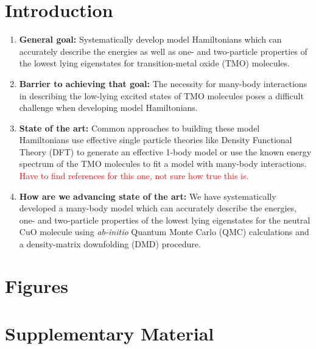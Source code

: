 \documentclass{article}
\begin{document}
\section{Introduction}
\begin{enumerate}
\item \textbf{General goal: }
Systematically develop model Hamiltonians which can accurately describe the energies as well as one- and two-particle properties of the lowest lying eigenstates for transition-metal oxide (TMO) molecules.

\item \textbf{Barrier to achieving that goal: } The necessity for many-body interactions in describing the low-lying excited states of TMO molecules poses a difficult challenge when developing model Hamiltonians.

\item \textbf{State of the art: } Common approaches to building these model Hamiltonians use effective single particle theories like Density Functional Theory (DFT) to generate an effective 1-body model or use the known energy spectrum of the TMO molecules to fit a model with many-body interactions. 
\textcolor{red}{Have to find references for this one, not sure how true this is.}

\item\textbf{How are we advancing state of the art: } We have systematically developed a many-body model which can accurately describe the energies, one- and two-particle properties of the lowest lying eigenstates for the neutral CuO molecule using \textit{ab-initio} Quantum Monte Carlo (QMC) calculations and a density-matrix downfolding (DMD) procedure. 
\end{enumerate}

\section{Figures}

\section{Supplementary Material} 
\end{document}
